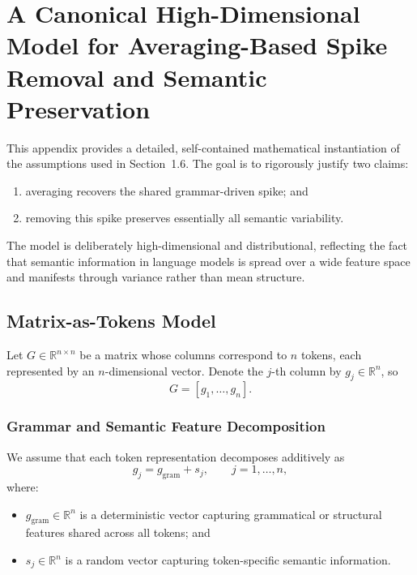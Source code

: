 \newcommand{\R}{\mathbb{R}}
\newcommand{\E}{\mathbb{E}}
\newcommand{\1}{\mathbf{1}}

\makeatletter
{}
\makeatother


\chapter{A Canonical High-Dimensional Model for Averaging-Based Spike Removal and Semantic Preservation}
\label{app:canonical_model}

This appendix provides a detailed, self-contained mathematical instantiation of the
assumptions used in Section~1.6.
The goal is to rigorously justify two claims:
\begin{enumerate}
    \item averaging recovers the shared grammar-driven spike; and
    \item removing this spike preserves essentially all semantic variability.
\end{enumerate}
The model is deliberately high-dimensional and distributional, reflecting the fact
that semantic information in language models is spread over a wide feature space and
manifests through variance rather than mean structure.

\section{Matrix-as-Tokens Model}

Let $G \in \R^{n\times n}$ be a matrix whose columns correspond to $n$ tokens, each
represented by an $n$-dimensional vector.
Denote the $j$-th column by $g_j \in \R^n$, so
\[
G = [g_1,\dots,g_n].
\]

\subsection{Grammar and Semantic Feature Decomposition}

We assume that each token representation decomposes additively as
\begin{equation}
\label{eq:col_decomp}
g_j = g_{\mathrm{gram}} + s_j,
\qquad j=1,\dots,n,
\end{equation}
where:
\begin{itemize}
\item $g_{\mathrm{gram}} \in \R^n$ is a deterministic vector capturing grammatical or
      structural features shared across all tokens; and
\item $s_j \in \R^n$ is a random vector capturing token-specific semantic information.
\end{itemize}

